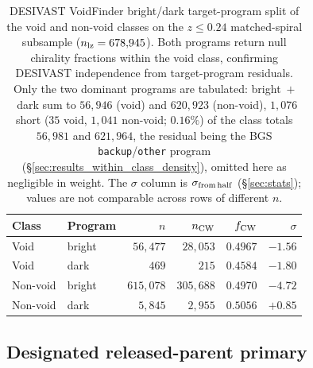 \documentclass[aps,prd,twocolumn,superscriptaddress,showpacs,preprintnumbers,nofootinbib,longbibliography,floatfix]{revtex4-2}
\begin{document}
\begin{table}[ht]
\caption{DESIVAST VoidFinder bright/dark target-program split of
the void and non-void classes on the $z \leq 0.24$ matched-spiral
subsample ($n_{\rm lz} = 678{,}945$). Both programs return null
chirality fractions within the void class, confirming DESIVAST
independence from target-program residuals. Only the two dominant
programs are tabulated: bright~$+$~dark sum to $56{,}946$ (void) and
$620{,}923$ (non-void), $1{,}076$ short ($35$ void, $1{,}041$
non-void; $0.16\%$) of the class totals $56{,}981$ and $621{,}964$,
the residual being the BGS \texttt{backup}/\texttt{other} program
(\S\ref{sec:results_within_class_density}), omitted here as
negligible in weight. The $\sigma$ column
is $\sigma_{\rm from\,half}$ (\S\ref{sec:stats}); values are not
comparable across rows of different $n$.}
\label{tab:desivast_program_split}
\begin{ruledtabular}
\begin{tabular}{llrrrr}
Class & Program & $n$ & $n_{\rm CW}$ & $f_{\rm CW}$ & $\sigma$ \\
\hline
Void     & bright & $56{,}477$ & $28{,}053$ & $0.4967$ & $-1.56$ \\
Void     & dark   & $469$      & $215$      & $0.4584$ & $-1.80$ \\
Non-void & bright & $615{,}078$ & $305{,}688$ & $0.4970$ & $-4.72$ \\
Non-void & dark   & $5{,}845$  & $2{,}955$  & $0.5056$ & $+0.85$ \\
\end{tabular}
\end{ruledtabular}
\end{table}

\subsection{Designated released-parent primary}\label{sec:released_parent_primary}
\end{document}
